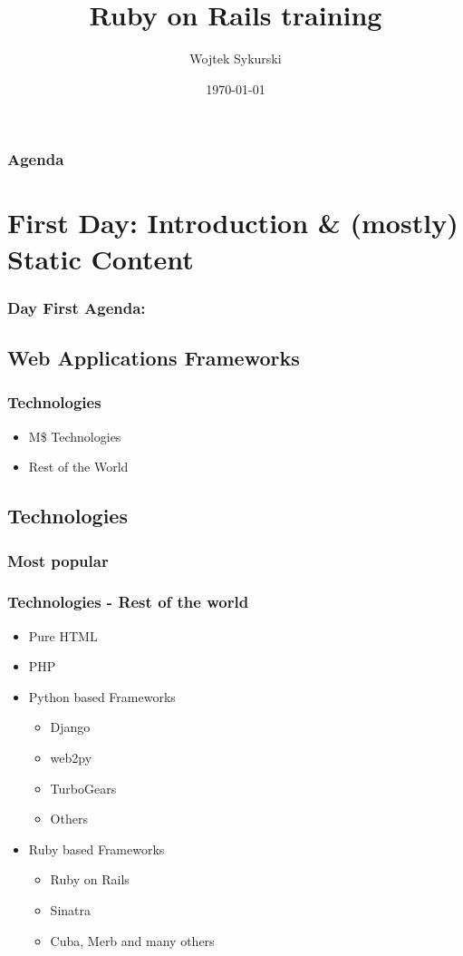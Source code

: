\documentclass{beamer}
\title{Ruby on Rails training}
\author{Wojtek Sykurski}
\institute[Samsung R\&D]
{
  Samsung R\&D Poland \\
  \medskip
  \textit{w.sykurski@samsung.com}
}
\date{\today}
\begin{document}
\begin{frame}
  \titlepage 
\end{frame}

\begin{frame}
  \frametitle{Agenda}
  \tableofcontents[hideallsubsections]
\end{frame}

\section{First Day: Introduction \& (mostly) Static Content}
\begin{frame}
  \frametitle{Day First Agenda:}
  \tableofcontents
  [
  currentsection,
  sectionstyle=hide/hide,
  subsectionstyle=show/show/hide
  ]
\end{frame}

\subsection{Web Applications Frameworks}

\begin{frame}
  \frametitle{Technologies}
  \begin{itemize}
    \item M\$ Technologies
    \item Rest of the World
  \end{itemize}
  
\end{frame}

\subsection{Technologies}

\subsubsection{Most popular}

\begin{frame}
  \frametitle{Technologies - Rest of the world}
  \begin{itemize}
    \item Pure HTML
    \item PHP
    \item Python based Frameworks
      \begin{itemize}
        \item Django
        \item web2py
        \item TurboGears
        \item Others
      \end{itemize}
    \item Ruby based Frameworks
      \begin{itemize}
        \item Ruby on Rails
        \item Sinatra
        \item Cuba, Merb and many others
      \end{itemize}
  \end{itemize}
  
\end{frame}
\end{document}

